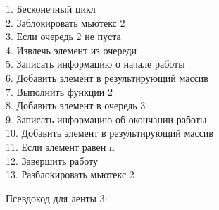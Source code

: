 \documentclass[a4paper,12pt]{article}
\begin{document}
\begin{flushleft}
	1. Бесконечный цикл\\
		2. \hspace{1.5cm} Заблокировать мьютекс 2\\
		3. \hspace{1.5cm} Если очередь 2 не пуста\\
		4. \hspace{3cm} Извлечь элемент из очереди\\
		5. \hspace{3cm} Записать информацию о начале работы\\
		6. \hspace{3cm} Добавить элемент в результирующий массив\\
		7. \hspace{3cm} Выполнить функции 2\\
		8. \hspace{3cm} Добавить элемент в очередь 3\\
		9. \hspace{3cm} Записать информацию об окончании работы\\
		10. \hspace{3cm} Добавить элемент в результирующий массив\\
		11. \hspace{3cm} Если элемент равен n\\
		12. \hspace{4.5cm} Завершить работу\\
		13. \hspace{1.5cm} Разблокировать мьютекс 2\\
\end{flushleft}

Псевдокод для ленты 3:
\end{document}
